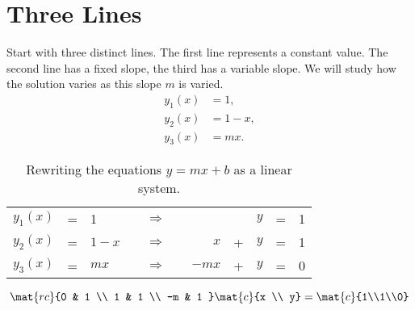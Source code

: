 \section{Three Lines}  %
Start with three distinct lines. The first line represents a constant value. The second line has a fixed slope, the third has a variable slope. We will study how the solution varies as this slope $m$ is varied.
  \begin{equation*}   %
     \begin{split}
       y_{1}(x) &= 1, \\
       y_{2}(x) &= 1 - x, \\
       y_{3}(x) &= m x.
     \end{split}
  \end{equation*}


  \begin{table}[htbp]
  \caption{Rewriting the equations $y=mx+b$ as a linear system.}
  \begin{center}
    \begin{tabular}{lclcccrcrcl}
      $y_{1}(x)$ &=&  1       && $\Rightarrow$ && &&          $y$ &=& 1 \\
      $y_{2}(x)$ &=&  $1 - x$ && $\Rightarrow$ && $x$   & + & $y$ &=& 1 \\
      $y_{3}(x)$ &=&  $m x$   && $\Rightarrow$ && $-mx$ & + & $y$ &=& 0 \\
    \end{tabular}
  \end{center}
  \end{table}%


  \begin{equation*}   %
      \mat{rc}{0 & 1 \\ 1 & 1 \\ -m & 1 } 
      \mat{c}{x \\ y} = 
      \mat{c}{1\\1\\0}
  \end{equation*}

